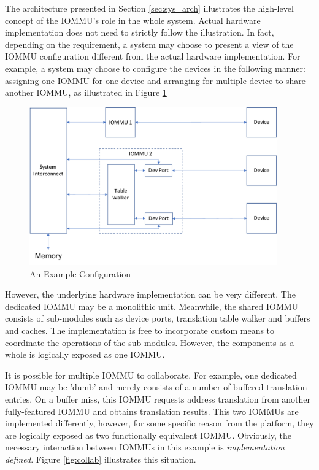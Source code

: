 The architecture presented in Section \ref{sec:sys_arch} illustrates the high-level
concept of the IOMMU's role in the whole system. Actual hardware implementation does not
need to strictly follow the illustration. In fact, depending on the requirement, a system
may choose to present a view of the IOMMU configuration different from the actual hardware
implementation. For example, a system may choose to configure the devices in the following
manner: assigning one IOMMU for one device and arranging for multiple device to share
another IOMMU, as illustrated in Figure \ref{fig:cmp_plcmnt}

\begin{figure}[ht!]
    \centering
    \includegraphics[width=0.95\textwidth]{img/cmp_plcmnt.pdf}
    \caption{An Example Configuration}
    \label{fig:cmp_plcmnt}
\end{figure}

However, the underlying hardware implementation can be very different. The dedicated IOMMU
may be a monolithic unit. Meanwhile, the shared IOMMU consists of sub-modules such as
device ports, translation table walker and buffers and caches. The implementation is
free to incorporate custom means to coordinate the operations of the sub-modules. However,
the components as a whole is logically exposed as one IOMMU.

It is possible for multiple IOMMU to collaborate. For example, one dedicated IOMMU may be
'dumb' and merely consists of a number of buffered translation entries. On a buffer miss,
this IOMMU requests address translation from another fully-featured IOMMU and obtains
translation results. This two IOMMUs are implemented differently, however, for some
specific reason from the platform, they are logically exposed as two functionally
equivalent IOMMU. Obviously, the necessary interaction between IOMMUs in this example is
\textit{implementation defined}. Figure \ref{fig:collab} illustrates this situation.

